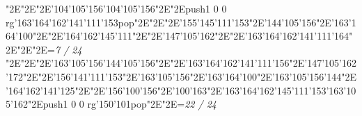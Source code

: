 \null\vfill\enskip\enskip\enskip\ipa\char"2E\enskip\enskip\enskip\ipa\char"2E\enskip\ipa\char"2E\ipa\char'104\ipa\char'105\ipa\char'156\bigskip\ipa\char'104\ipa\char'105\ipa\char'156\ipa\char"2E\enskip\enskip\enskip\ipa\char"2E\pdfcolorstack\match push{1 0 0 rg}\ipa\char'163\ipa\char'164\ipa\char'162\ipa\char'141\ipa\char'111\ipa\char'153\pdfcolorstack\match pop{}\bigskip\enskip\enskip\ipa\char"2E\enskip\enskip\enskip\enskip\ipa\char"2E\enskip\ipa\char"2E\ipa\char'155\ipa\char'145\ipa\char'111\ipa\char'153\ipa\char"2E\ipa\char'144\ipa\char'105\ipa\char'156\ipa\char"2E\ipa\char'163\ipa\char'164\ipa\char'100\ipa\char"2E\enskip\enskip\enskip\enskip\bigskip\enskip\ipa\char"2E\ipa\char'164\ipa\char'162\ipa\char'145\ipa\char'111\ipa\char"2E\enskip\enskip\ipa\char"2E\ipa\char'147\ipa\char'105\ipa\char'162\ipa\char"2E\enskip\enskip\ipa\char"2E\ipa\char'163\ipa\char'164\ipa\char'162\ipa\char'141\ipa\char'111\ipa\char'164\bigskip\enskip\enskip\enskip\ipa\char"2E\enskip\enskip\ipa\char"2E\enskip\enskip\enskip\ipa\char"2E\enskip\enskip\enskip\bigskip\vfill\footline={\hfill\tenrm\it 7 / 24}\eject
\null\vfill\enskip\enskip\enskip\ipa\char"2E\enskip\enskip\enskip\ipa\char"2E\enskip\ipa\char"2E\ipa\char'163\ipa\char'105\ipa\char'156\bigskip\ipa\char'144\ipa\char'105\ipa\char'156\ipa\char"2E\enskip\enskip\enskip\ipa\char"2E\ipa\char'163\ipa\char'164\ipa\char'162\ipa\char'141\ipa\char'111\ipa\char'156\bigskip\enskip\enskip\ipa\char"2E\ipa\char'147\ipa\char'105\ipa\char'162\ipa\char'172\ipa\char"2E\enskip\ipa\char"2E\ipa\char'156\ipa\char'141\ipa\char'111\ipa\char'153\ipa\char"2E\ipa\char'163\ipa\char'105\ipa\char'156\ipa\char"2E\ipa\char'163\ipa\char'164\ipa\char'100\ipa\char"2E\ipa\char'163\ipa\char'105\ipa\char'156\ipa\char'144\bigskip\enskip\ipa\char"2E\ipa\char'164\ipa\char'162\ipa\char'141\ipa\char'125\ipa\char"2E\enskip\enskip\ipa\char"2E\ipa\char'156\ipa\char'100\ipa\char'156\ipa\char"2E\ipa\char'100\ipa\char'163\ipa\char"2E\ipa\char'163\ipa\char'164\ipa\char'162\ipa\char'145\ipa\char'111\ipa\char'153\bigskip\ipa\char'163\ipa\char'105\ipa\char'162\ipa\char"2E\pdfcolorstack\match push{1 0 0 rg}\ipa\char'150\ipa\char'101\pdfcolorstack\match pop{}\ipa\char"2E\enskip\enskip\enskip\ipa\char"2E\enskip\enskip\enskip\bigskip\vfill\footline={\hfill\tenrm\it 22 / 24}\eject
